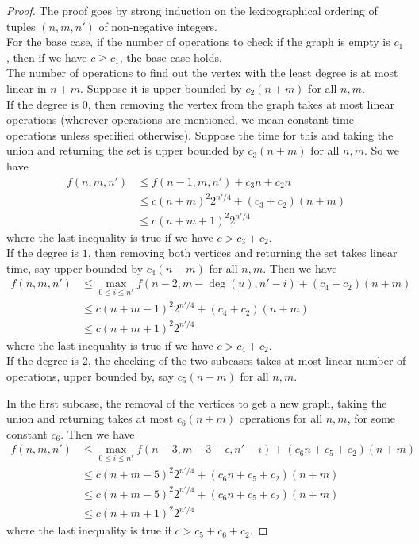 \documentclass[answers]{exam}
\newcommand{\nl}{\vspace{0.2cm}\\}
\begin{document}
\begin{questions}
\begin{solution}
\begin{proof}
    The proof goes by strong induction on the lexicographical ordering of tuples $(n, m, n')$ of non-negative integers.\nl
    For the base case, if the number of operations to check if the graph is empty is $c_1$, then if we have $c \ge c_1$, the base case holds.\nl
    The number of operations to find out the vertex with the least degree is at most linear in $n + m$. Suppose it is upper bounded by
    $c_2(n + m)$ for all $n, m$.\nl
    If the degree is $0$, then removing the vertex from the graph takes at most linear operations (wherever operations are mentioned, we mean constant-time operations unless specified otherwise).
    Suppose the time for this and taking the union and returning the set is upper bounded by $c_3(n + m)$ for all $n, m$. So we have 
    \begin{align*}
        f(n, m, n') &\le f(n - 1, m, n') + c_3 n + c_2 n\\
        &\le c(n + m)^2 2^{n'/4} + (c_3 + c_2)(n + m)\\
        &\le c(n + m + 1)^2 2^{n' / 4}
    \end{align*}
        where the last inequality is true if we have $c > c_3 + c_2$.\nl
    If the degree is $1$, then removing both vertices and returning the set takes linear time, say upper bounded by $c_4(n + m)$ for all $n, m$. Then we have \begin{align*}
        f(n, m, n') &\le \max_{0 \le i \le n'}f(n - 2, m - \deg(u), n' - i) + (c_4 + c_2)(n + m)\\
        &\le c(n + m - 1)^2 2^{n'/4} + (c_4 + c_2)(n + m)\\
        &\le c(n + m + 1)^2 2^{n'/4}
\end{align*}
    where the last inequality is true if we have $c > c_4 + c_2$.\nl
    If the degree is $2$, the checking of the two subcases takes at most linear number of operations, upper bounded by, say $c_5(n + m)$ for all $n, m$.
    
    In the first subcase, the removal of the vertices to get a new graph, taking the union and returning takes at most $c_6(n + m)$ operations for all $n, m$, for some constant $c_6$. Then we have 
    \begin{align*}
        f(n, m, n') &\le \max_{0 \le i \le n'}f(n - 3, m - 3 - \epsilon, n' - i) + (c_6 n + c_5 + c_2)(n + m)\\
                &\le c(n + m - 5)^2 2^{n'/4} + (c_6 n + c_5 + c_2)(n + m)\\
                &\le c(n + m - 5)^2 2^{n'/4} + (c_6 n + c_5 + c_2)(n + m)\\
                &\le c(n + m + 1)^2 2^{n'/4}
    \end{align*}
    where the last inequality is true if $c > c_5 + c_6 + c_2$.
    

\end{proof}
\end{solution}
\end{questions}
\end{document}

